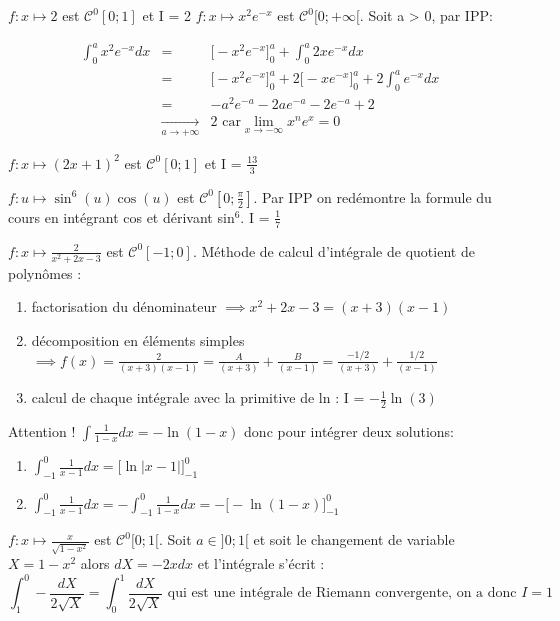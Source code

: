 \begin{Answer}
\Question $f:x\longmapsto2$ est $\mathcal{C}^0[0;1]$ et I = 2
\Question $f:x\longmapsto x^2 e^{-x}$ est $\mathcal{C}^0[0;+\infty[$. Soit a > 0, par IPP:

\begin{eqnarray}
\int_{0}^{a} x^2 e^{-x} dx & = & \Big[-x^2 e^{-x}\Big]_0^a + \int_{0}^{a} 2x e^{-x} dx \nonumber \\
 & = & \Big[-x^2 e^{-x}\Big]_0^a + 2 \Big[-x e^{-x}\Big]_0^a + 2\int_{0}^{a} e^{-x} dx \nonumber \\
 & = & -a^2 e^{-a} - 2 a e^{-a} -2 e^{-a} + 2 \nonumber \\
 & \underset{a \to +\infty}\longrightarrow & 2 \nonumber \text{  car} \lim_{x \to -\infty} x^n e^x = 0
\end{eqnarray}

\Question $f:x\longmapsto (2x+1)^2$ est $\mathcal{C}^0[0;1]$ et I = $\frac{13}{3}$

\Question $f:u\longmapsto \sin^6(u)\cos(u)$ est $\mathcal{C}^0[0;\frac{\pi}{2}]$. Par IPP on redémontre la formule du cours en intégrant cos et dérivant sin$^6$. I = $\frac{1}{7}$

\Question $f:x\longmapsto \frac{2}{x^2 + 2x - 3}$ est $\mathcal{C}^0[-1;0]$. 
Méthode de calcul d'intégrale de quotient de polynômes :
\begin{enumerate}
	\item factorisation du dénominateur $\implies x^2 + 2x - 3 = (x+3)(x-1)$
	\item décomposition en éléments simples $\implies f(x) = \frac{2}{(x+3)(x-1)} = \frac{A}{(x+3)} + \frac{B}{(x-1)} = \frac{-1/2}{(x+3)} + \frac{1/2}{(x-1)} $
	\item calcul de chaque intégrale avec la primitive de ln : I = $- \frac{1}{2} \ln(3)$
\end{enumerate}
Attention ! $\int \frac{1}{1 - x}dx = - \ln(1-x)$ donc pour intégrer deux solutions:
\begin{enumerate}
	\item $\int_{-1}^{0} \frac{1}{x - 1}dx = \Big[\ln|x-1|\Big]_{-1}^{0}$
	\item $\int_{-1}^{0} \frac{1}{x - 1}dx = - \int_{-1}^{0} \frac{1}{1 - x}dx = - \Big[-\ln(1-x)\Big]_{-1}^{0} $
\end{enumerate}

\Question $f:x\longmapsto \frac{x}{\sqrt{1-x^2}}$ est $\mathcal{C}^0[0;1[$. Soit $a\in ]0;1[$ et soit le changement de variable $X = 1 - x^2$ alors $dX = -2 x dx$ et l'intégrale s'écrit :
$$\int_{1}^{0} - \frac{dX}{2 \sqrt{X}}  = \int_{0}^{1} \frac{dX}{2 \sqrt{X}} \text{ qui est une intégrale de Riemann convergente, on a donc } I = 1$$


\end{Answer}
